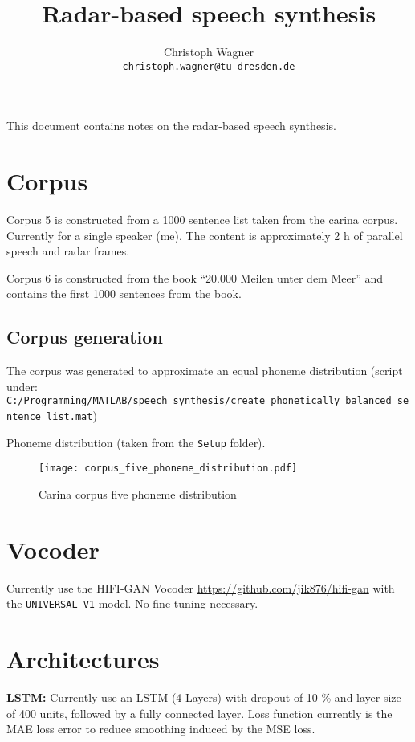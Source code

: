 \documentclass{article}
\author{Christoph Wagner  \\ \texttt{christoph.wagner@tu-dresden.de}}
\title{Radar-based speech synthesis}
\begin{document}
\maketitle

This document contains notes on the radar-based speech synthesis.

\section{Corpus}
Corpus 5 is constructed from a 1000 sentence list taken from the carina corpus. Currently for a single speaker (me). The content is approximately 2 h of parallel speech and radar frames.

Corpus 6 is constructed from the book ``20.000 Meilen unter dem Meer'' and contains the first 1000 sentences from the book.

\subsection{Corpus generation}
The corpus was generated to approximate an equal phoneme distribution (script under: \\ \texttt{C:/Programming/MATLAB/speech\_synthesis/create\_phonetically\_balanced\_sentence\_list.mat})

Phoneme distribution (taken from the \texttt{Setup} folder).

\begin{figure}[htbt]
\centering
\texttt{[image: corpus\_five\_phoneme\_distribution.pdf]}
\caption{Carina corpus five phoneme distribution}
\label{fig:carina_corpus_phoneme_distr}
\end{figure}   


\section{Vocoder}

Currently use the HIFI-GAN Vocoder 
\url{https://github.com/jik876/hifi-gan} with the \texttt{UNIVERSAL\_V1} model. No fine-tuning necessary. 

\section{Architectures}

\textbf{LSTM:} Currently use an LSTM (4 Layers) with dropout of 10 \% and layer size of 400 units, followed by a fully connected layer. Loss function currently is the MAE loss error to reduce smoothing induced by the MSE loss.
\end{document}
